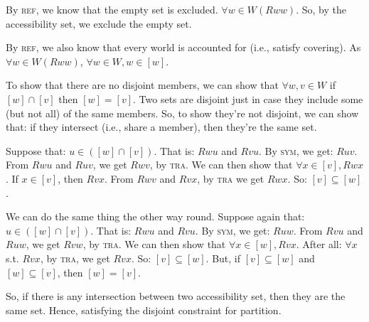 \documentclass[a4paper, 11pt]{article}                  %
\begin{document}
\begin{enumerate}
{       By \textsc{ref}, we know that the empty set is excluded. $\forall w \in W (Rww)$. So, by the accessibility set, we exclude the empty set. 

       By \textsc{ref}, we also know that every world is accounted for (i.e., satisfy covering). As $\forall w \in W (Rww)$, $\forall w \in W, w \in [w]$. 

       To show that there are no disjoint members, we can show that $\forall w, v \in W$ if $[w] \cap [v]$ then $[w] = [v]$. Two sets are disjoint just in case they include some (but not all) of the same members. So, to show they're not disjoint, we can show that: if they intersect (i.e., share a member), then they're the same set. 

       Suppose that: $u \in ([w] \cap [v])$. That is: $Rwu$ and $Rvu$. By \textsc{sym}, we get: $Ruv$. 
       From $Rwu$ and $Ruv$, we get $Rwv$, by \textsc{tra}. We can then show that $\forall x \in [v], Rwx$. If $x \in [v]$, then $Rvx$. From $Rwv$ and $Rvx$, by \textsc{tra} we get $Rwx$. So: $[v] \subseteq [w]$. 

       We can do the same thing the other way round. Suppose again that: $u \in ([w] \cap [v])$. That is: $Rwu$ and $Rvu$. By \textsc{sym}, we get: $Ruw$. 
       From $Rvu$ and $Ruw$, we get $Rvw$, by \textsc{tra}. We can then show that $\forall x \in [w], Rvx$. After all: $\forall x$ s.t. $Rvx$, by \textsc{tra}, we get $Rvx$. So: $[v] \subseteq [w]$. But, if $[v] \subseteq [w]$ and $[w] \subseteq [v]$, then $[w] = [v]$. 

       So, if there is any intersection between two accessibility set, then they are the same set. Hence, satisfying the disjoint constraint for partition. 

}
\end{enumerate}
\end{document}
